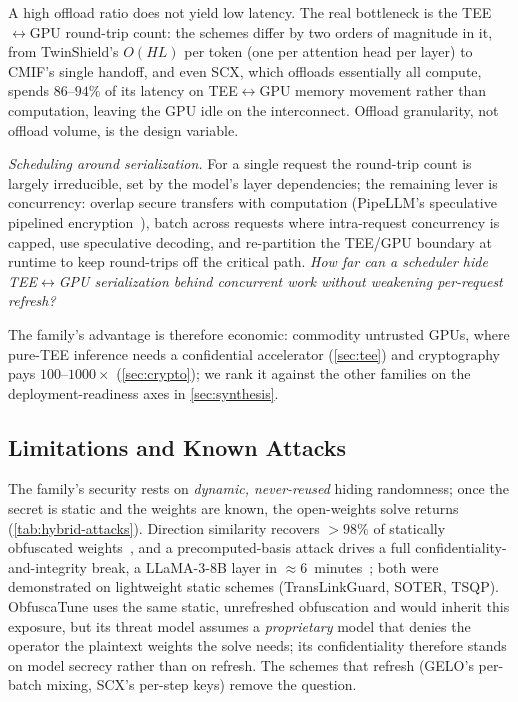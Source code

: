 \begin{keyinsight}
A high offload ratio does not yield low latency. The real bottleneck is the TEE$\leftrightarrow$GPU
round-trip count: the schemes differ by two orders of magnitude in it, from TwinShield's $O(HL)$ per
token (one per attention head per layer) to CMIF's single handoff, and even SCX, which
offloads essentially all compute, spends $86$--$94\%$ of its latency on TEE$\leftrightarrow$GPU memory
movement rather than computation, leaving the GPU idle on the interconnect. Offload granularity, not
offload volume, is the design variable.
\end{keyinsight}

\begin{openproblem}
\emph{Scheduling around serialization.} For a single request the round-trip count is largely
irreducible, set by the model's layer dependencies; the remaining lever is concurrency: overlap secure
transfers with computation (PipeLLM's speculative pipelined encryption~\citep{pipellm}), batch across
requests where intra-request concurrency is capped, use speculative decoding, and
re-partition the TEE/GPU boundary at runtime to keep round-trips off the critical path. \emph{How far can a
scheduler hide TEE$\leftrightarrow$GPU serialization behind concurrent work without weakening per-request refresh?}
\end{openproblem}

The family's advantage is therefore economic:
commodity untrusted GPUs,
where pure-TEE inference needs a confidential accelerator (\cref{sec:tee}) and cryptography
pays $100$--$1000\times$ (\cref{sec:crypto}); we rank it against the other families on the
deployment-readiness axes in \cref{sec:synthesis}.


\subsection{Limitations and Known Attacks}
The family's security rests on \emph{dynamic, never-reused} hiding randomness; once the secret is
static and the weights are known, the open-weights solve returns (\cref{tab:hybrid-attacks}).
Direction similarity recovers ${>}98\%$ of statically obfuscated weights~\citep{arrowmatch}, and a
precomputed-basis attack drives a full confidentiality-and-integrity break, a LLaMA-3-8B layer in
${\approx}6$~minutes~\citep{saini_precomp_break}; both were demonstrated on lightweight static schemes
(TransLinkGuard, SOTER, TSQP). ObfuscaTune uses the same static, unrefreshed obfuscation and would
inherit this exposure, but its threat model assumes a \emph{proprietary} model that denies the
operator the plaintext weights the solve needs; its confidentiality therefore stands on model
secrecy rather than on refresh. The schemes that refresh (GELO's per-batch mixing, SCX's per-step
keys) remove the question.


